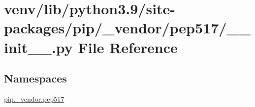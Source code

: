 \hypertarget{venv_2lib_2python3_89_2site-packages_2pip_2__vendor_2pep517_2____init_____8py}{}\section{venv/lib/python3.9/site-\/packages/pip/\+\_\+vendor/pep517/\+\_\+\+\_\+init\+\_\+\+\_\+.py File Reference}
\label{venv_2lib_2python3_89_2site-packages_2pip_2__vendor_2pep517_2____init_____8py}
\subsection*{Namespaces}
\begin{DoxyCompactItemize}
\item 
 \hyperlink{namespacepip_1_1__vendor_1_1pep517}{pip.\+\_\+vendor.\+pep517}
\end{DoxyCompactItemize}
